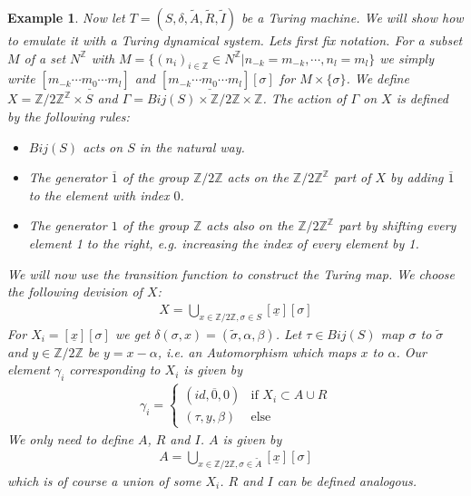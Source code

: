 \documentclass[12pt,a4paper]{scrartcl}
\newtheorem{Example}[Theorem]{Example}
\numberwithin{equation}{section}
\newcommand{\Z}{\mathbb{Z}} %
\newcommand{\2}{\mathbb{Z} / 2 \mathbb{Z}}
\newcommand{\1}{\overline{1}}
\newcommand{\0}{\overline{0}}
\begin{document}
\begin{Example}\label{TMtoTDS}
	Now let  $T=(S,\delta, \tilde{A}, \tilde{R}, \tilde{I})$ be a Turing machine. We will show how to emulate it with a Turing dynamical system. Lets first fix notation. For a subset $M$ of a set $N^\Z$ with $M = \{(n_i)_{i \in \Z} \in N^\Z | n_{-k} = m_{-k}, \cdots, n_l = m_l \}$ we simply write $[m_{-k} \cdots \underline{m_0} \cdots m_l]$ and $[m_{-k} \cdots \underline{m_0} \cdots m_l][\sigma]$ for $M \times \{\sigma\}$. We define $X = \2^\Z \times S$ and $\Gamma = Bij(S) \times \2 \times \Z$. 
	The action of $\Gamma$ on $X$ is defined by the following rules:
	\begin{itemize}
		\item $Bij(S)$ acts on $S$ in the natural way.
		\item The generator $\overline{1}$ of the group $\Z / 2\Z$ acts on the $\Z / 2\Z^\Z$ part of $X$ by adding $\overline{1}$ to the element with index $0$.
		\item The generator $1$ of the group $\Z$ acts also on the $\Z / 2\Z^\Z$ part by shifting every element 1 to the right, e.g. increasing the index of every element by 1. 
	\end{itemize}
	We will now use the transition function to construct the Turing map. We choose the following devision of $X$:
	\begin{align*}
	X = \bigcup_{x \in \2, \sigma \in S} [\underline{x}][\sigma]
	\end{align*}
	For $X_i = [\underline{x}][\sigma]$ we get $\delta(\sigma, x) = (\tilde{\sigma}, \alpha, \beta)$. Let $\tau \in Bij(S)$ map $\sigma$ to $\tilde{\sigma}$ and $y \in \2$ be $y=x-\alpha$, i.e. an Automorphism  which maps $x$ to $\alpha$. Our element $\gamma_i$ corresponding to $X_i$ is given by 
	\begin{align*}
	\gamma_i = \begin{cases}
	(id, \overline{0}, 0) & \text{if } X_i \subset A \cup R \\
	(\tau, y, \beta) & \text{else}
	\end{cases}
	\end{align*} 
	We only need to define $A$, $R$ and $I$. $A$ is given by
	\begin{align*}
	A = \bigcup_{x \in \2, \sigma \in \tilde{A}}[\underline{x}][\sigma]
	\end{align*}
	which is of course a union of some $X_i$. $R$ and $I$ can be defined analogous.
\end{Example} 
\end{document}
